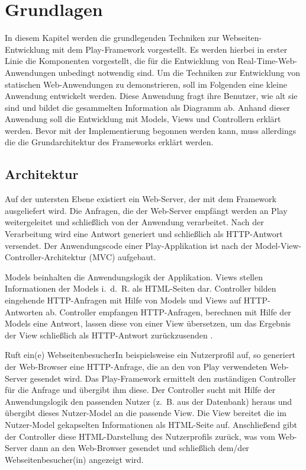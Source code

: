 
\chapter{Grundlagen} %
\label{cha:grundlagen}

In diesem Kapitel werden die grundlegenden Techniken zur Webseiten-Entwicklung mit dem Play-Framework vorgestellt.
Es werden hierbei in erster Linie die Komponenten vorgestellt, die für die Entwicklung von Real-Time-Web-Anwendungen unbedingt notwendig sind.
Um die Techniken zur Entwicklung von statischen Web-Anwendungen zu demonstrieren, soll im Folgenden eine kleine Anwendung entwickelt werden.
Diese Anwendung fragt ihre Benutzer, wie alt sie sind und bildet die gesammelten Information als Diagramm ab.
Anhand dieser Anwendung soll die Entwicklung mit Models, Views und Controllern erklärt werden.
Bevor mit der Implementierung begonnen werden kann, muss allerdings die die Grundarchitektur des Frameworks erklärt werden.


\section{Architektur} %
\label{sec:architektur}

Auf der untersten Ebene existiert ein Web-Server, der mit dem Framework ausgeliefert wird.
Die Anfragen, die der Web-Server empfängt werden an Play weitergeleitet und schließlich von der Anwendung verarbeitet.
Nach der Verarbeitung wird eine Antwort generiert und schließlich als HTTP-Antwort versendet.
Der Anwendungscode einer Play-Applikation ist nach der Model-View-Controller-Architektur (MVC) aufgebaut.

Models beinhalten die Anwendungslogik der Applikation.
Views stellen Informationen der Models i.~d.~R. als HTML-Seiten dar.
Controller bilden eingehende HTTP-Anfragen mit Hilfe von Models und Views auf HTTP-Antworten ab.
Controller empfangen HTTP-Anfragen, berechnen mit Hilfe der Models eine Antwort, lassen diese von einer View übersetzen, um das Ergebnis der View schließlich als HTTP-Antwort zurückzusenden \cite[vgl.][S.~45--48]{play_for_scala}.

Ruft ein(e) WebseitenbesucherIn beispielsweise ein Nutzerprofil auf, so generiert der Web-Browser eine HTTP-Anfrage, die an den von Play verwendeten Web-Server gesendet wird.
Das Play-Framework ermittelt den zuständigen Controller für die Anfrage und übergibt ihm diese.
Der Controller sucht mit Hilfe der Anwendungslogik den passenden Nutzer (z.~B. aus der Datenbank) heraus und übergibt dieses Nutzer-Model an die passende View.
Die View bereitet die im Nutzer-Model gekapselten Informationen als HTML-Seite auf.
Anschließend gibt der Controller diese HTML-Darstellung des Nutzerprofils zurück, was vom Web-Server dann an den Web-Browser gesendet und schließlich dem/der Webseitenbesucher(in) angezeigt wird.

